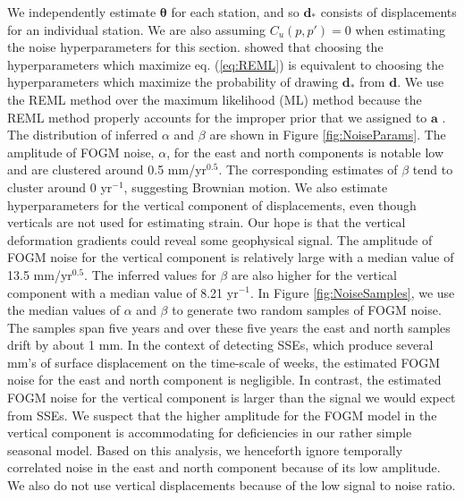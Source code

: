 \documentclass[10pt,letter]{article}
\begin{document}
We independently estimate $\bm{\theta}$ for each station, and so $\bm{d}_*$ consists of displacements for an individual station. We are also assuming $C_u(p,p')=0$ when estimating the noise hyperparameters for this section. \citet{Harville1974} showed that choosing the hyperparameters which maximize eq. (\ref{eq:REML}) is equivalent to choosing the hyperparameters which maximize the probability of drawing $\bm{d}_*$ from $\bm{d}$.  We use the REML method over the maximum likelihood (ML) method \citep[e.g.,][]{Langbein1997} because the REML method properly accounts for the improper prior that we assigned to $\bm{a}$ \citep{Hines2017}. The distribution of inferred $\alpha$ and $\beta$ are shown in Figure \ref{fig:NoiseParams}. The amplitude of FOGM noise, $\alpha$, for the east and north components is notable low and are clustered around 0.5 mm/yr$^{0.5}$. The corresponding estimates of $\beta$ tend to cluster around 0 yr$^{-1}$, suggesting Brownian motion. We also estimate hyperparameters for the vertical component of displacements, even though verticals are not used for estimating strain. Our hope is that the vertical deformation gradients could reveal some geophysical signal. The amplitude of FOGM noise for the vertical component is relatively large with a median value of 13.5 mm/yr$^{0.5}$.  The inferred values for $\beta$ are also higher for the vertical component with a median value of 8.21 yr$^{-1}$. In Figure \ref{fig:NoiseSamples}, we use the median values of $\alpha$ and $\beta$ to generate two random samples of FOGM noise. The samples span five years and over these five years the east and north samples drift by about 1 mm. In the context of detecting SSEs, which produce several mm's of surface displacement on the time-scale of weeks, the estimated FOGM noise for the east and north component is negligible. In contrast, the estimated FOGM noise for the vertical component is larger than the signal we would expect from SSEs. We suspect that the higher amplitude for the FOGM model in the vertical component is accommodating for deficiencies in our rather simple seasonal model. Based on this analysis, we henceforth ignore temporally correlated noise in the east and north component because of its low amplitude. We also do not use vertical displacements because of the low signal to noise ratio.
\end{document}
